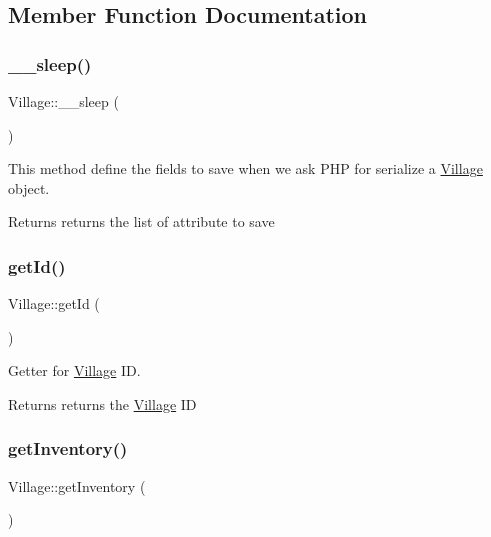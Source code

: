 \subsection{Member Function Documentation}
\mbox{\label{classVillage_a0bea180246dc3d1d6916cf295f57cb7a}} 
\subsubsection{\texorpdfstring{\+\_\+\+\_\+sleep()}{\_\_sleep()}}
{\footnotesize\ttfamily Village\+::\+\_\+\+\_\+sleep (\begin{DoxyParamCaption}{ }\end{DoxyParamCaption})}



This method define the fields to save when we ask P\+HP for serialize a \mbox{\hyperlink{classVillage}{Village}} object. 

\begin{DoxyReturn}{Returns}
returns the list of attribute to save 
\end{DoxyReturn}
\mbox{\label{classVillage_a5729e2071e18f7cd31bb65b771d51a59}} 
\subsubsection{\texorpdfstring{get\+Id()}{getId()}}
{\footnotesize\ttfamily Village\+::get\+Id (\begin{DoxyParamCaption}{ }\end{DoxyParamCaption})}



Getter for \mbox{\hyperlink{classVillage}{Village}} ID. 

\begin{DoxyReturn}{Returns}
returns the \mbox{\hyperlink{classVillage}{Village}} ID 
\end{DoxyReturn}
\mbox{\label{classVillage_a9c8354350df0f41853c44799625345d4}} 
\subsubsection{\texorpdfstring{get\+Inventory()}{getInventory()}}
{\footnotesize\ttfamily Village\+::get\+Inventory (\begin{DoxyParamCaption}{ }\end{DoxyParamCaption})}



